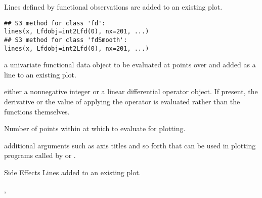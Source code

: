 \begin{Description}\relax
Lines defined by functional observations are added to an existing plot.
\end{Description}
\begin{Usage}
\begin{verbatim}
## S3 method for class 'fd':
lines(x, Lfdobj=int2Lfd(0), nx=201, ...)
## S3 method for class 'fdSmooth':
lines(x, Lfdobj=int2Lfd(0), nx=201, ...)
\end{verbatim}
\end{Usage}
\begin{Arguments}
\begin{ldescription}
\item[\code{x}] a univariate functional data object to be evaluated at 
points over  and added as a line to an existing plot.  

\item[\code{Lfdobj}] either a nonnegative integer or a linear differential operator
object.  If present, the derivative or the value of applying the
operator is evaluated rather than the functions themselves.

\item[\code{nx}] Number of points within  at which to evaluate 
for plotting.  

\item[\code{... }] additional arguments such as axis titles and so forth that can be
used in plotting programs called by  or
.  

\end{ldescription}
\end{Arguments}
\begin{Section}{Side Effects}
Lines added to an existing plot.
\end{Section}
\begin{SeeAlso}\relax
{}, 
\end{SeeAlso}
